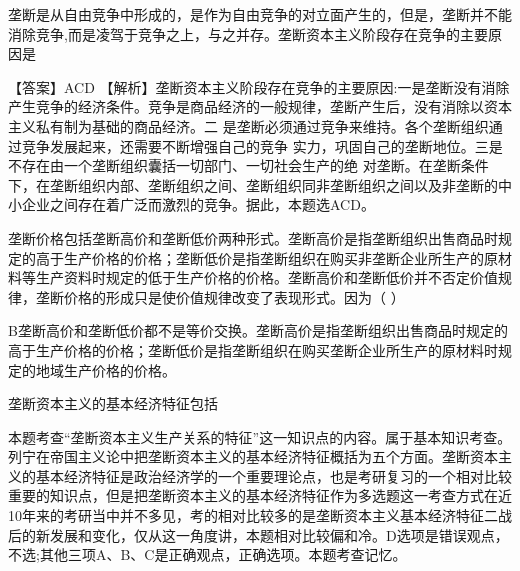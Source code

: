 \question 垄断是从自由竞争中形成的，是作为自由竞争的对立面产生的，但是，垄断并不能消除竞争,而是凌驾于竞争之上，与之并存。垄断资本主义阶段存在竞争的主要原因是
\par{}
\begin{solution}【答案】ACD
【解析】垄断资本主义阶段存在竞争的主要原因:一是垄断没有消除产生竞争的经济条件。竞争是商品经济的一般规律，垄断产生后，没有消除以资本主义私有制为基础的商品经济。二
是垄断必须通过竞争来维持。各个垄断组织通过竞争发展起来，还需要不断增强自己的竞争
实力，巩固自己的垄断地位。三是不存在由一个垄断组织囊括一切部门、一切社会生产的绝
对垄断。在垄断条件下，在垄断组织内部、垄断组织之间、垄断组织同非垄断组织之间以及非垄断的中小企业之间存在着广泛而激烈的竞争。据此，本题选ACD。
\end{solution}
\question 垄断价格包括垄断高价和垄断低价两种形式。垄断高价是指垄断组织出售商品时规定的高于生产价格的价格；垄断低价是指垄断组织在购买非垄断企业所生产的原材料等生产资料时规定的低于生产价格的价格。垄断高价和垄断低价并不否定价值规律，垄断价格的形成只是使价值规律改变了表现形式。因为（
）
\par{}
\begin{solution}B垄断高价和垄断低价都不是等价交换。垄断高价是指垄断组织出售商品时规定的高于生产价格的价格；垄断低价是指垄断组织在购买垄断企业所生产的原材料时规定的地域生产价格的价格。
\end{solution}
\question 垄断资本主义的基本经济特征包括
\par{}
\begin{solution}本题考查``垄断资本主义生产关系的特征''这一知识点的内容。属于基本知识考查。列宁在帝国主义论中把垄断资本主义的基本经济特征概括为五个方面。垄断资本主义的基本经济特征是政治经济学的一个重要理论点，也是考研复习的一个相对比较重要的知识点，但是把垄断资本主义的基本经济特征作为多选题这一考查方式在近10年来的考研当中并不多见，考的相对比较多的是垄断资本主义基本经济特征二战后的新发展和变化，仅从这一角度讲，本题相对比较偏和冷。D选项是错误观点，不选;其他三项A、B、C是正确观点，正确选项。本题考查记忆。
\end{solution}
